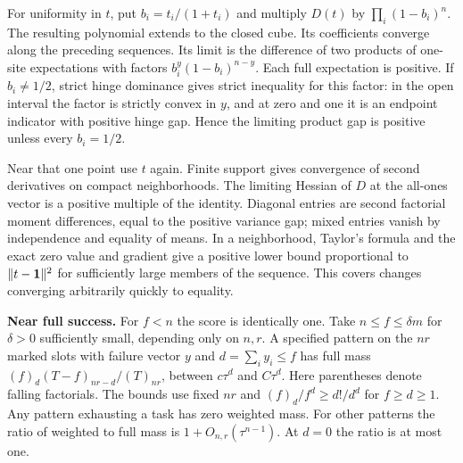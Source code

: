 For uniformity in $t$, put $b_i=t_i/(1+t_i)$ and multiply $D(t)$ by $\prod_i(1-b_i)^n$. The resulting polynomial extends to the closed cube. Its coefficients converge along the preceding sequences. Its limit is the difference of two products of one-site expectations with factors $b_i^y(1-b_i)^{n-y}$. Each full expectation is positive. If $b_i\ne1/2$, strict hinge dominance gives strict inequality for this factor: in the open interval the factor is strictly convex in $y$, and at zero and one it is an endpoint indicator with positive hinge gap. Hence the limiting product gap is positive unless every $b_i=1/2$.

Near that one point use $t$ again. Finite support gives convergence of second derivatives on compact neighborhoods. The limiting Hessian of $D$ at the all-ones vector is a positive multiple of the identity. Diagonal entries are second factorial moment differences, equal to the positive variance gap; mixed entries vanish by independence and equality of means. In a neighborhood, Taylor's formula and the exact zero value and gradient give a positive lower bound proportional to $\|t-{\bf1}\|^2$ for sufficiently large members of the sequence. This covers changes converging arbitrarily quickly to equality.

\textbf{Near full success.} For $f<n$ the score is identically one. Take $n\le f\le\delta m$ for $\delta>0$ sufficiently small, depending only on $n,r$. A specified pattern on the $nr$ marked slots with failure vector $y$ and $d=\sum_i y_i\le f$ has full mass $(f)_d(T-f)_{nr-d}/(T)_{nr}$, between $c\tau^d$ and $C\tau^d$. Here parentheses denote falling factorials. The bounds use fixed $nr$ and $(f)_d/f^d\ge d!/d^d$ for $f\ge d\ge1$. Any pattern exhausting a task has zero weighted mass. For other patterns the ratio of weighted to full mass is $1+O_{n,r}(\tau^{n-1})$. At $d=0$ the ratio is at most one.

